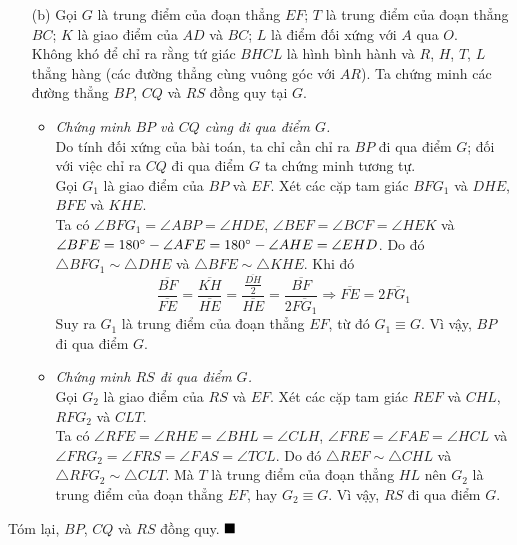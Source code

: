\documentclass{article} %
\newenvironment{solution}[1][Lời giải]{%
  \proof[\faPenNib \hspace{0.2cm} \ttfamily \scshape \large #1]%
}{\(\hfill \blacksquare\){\parfillskip0pt\par}}
\begin{document}
\begin{solution}
\begin{itemize}
                \item[(b)] Gọi \(G\) là trung điểm của đoạn thẳng \(EF\); \(T\) là trung điểm của đoạn thẳng \(BC\); \(K\) là giao điểm của \(AD\) và \(BC\); \(L\) là điểm đối xứng với \(A\) qua \(O\).\\
                Không khó để chỉ ra rằng tứ giác \(BHCL\) là hình bình hành và \(R\), \(H\), \(T\), \(L\) thẳng hàng (các đường thẳng cùng vuông góc với \(AR\)). Ta chứng minh các đường thẳng \(BP\), \(CQ\) và \(RS\) đồng quy tại \(G\).
                \begin{itemize}
                    \item \textit{Chứng minh \(BP\) và \(CQ\) cùng đi qua điểm \(G\).}\\
                    Do tính đối xứng của bài toán, ta chỉ cần chỉ ra \(BP\) đi qua điểm \(G\); đối với việc chỉ ra \(CQ\) đi qua điểm \(G\) ta chứng minh tương tự.\\
                    Gọi \(G_1\) là giao điểm của \(BP\) và \(EF\). Xét các cặp tam giác \(BFG_1\) và \(DHE\), \(BFE\) và \(KHE\).\\
                    Ta có \(\angle BFG_1 = \angle ABP = \angle HDE\), \(\angle BEF = \angle BCF = \angle HEK\) và \(\angle BFE = 180 \degree - \angle AFE = 180 \degree - \angle AHE = \angle EHD\). Do đó \(\triangle BFG_1 \sim \triangle DHE\) và \(\triangle BFE \sim \triangle KHE\). Khi đó
                    \[\frac{\overline{BF}}{\overline{FE}} = \frac{\overline{KH}}{\overline{HE}} = \frac{\frac{\overline{DH}}{2}}{\overline{HE}} = \frac{\overline{BF}}{2\overline{FG_1}} \Rightarrow \overline{FE} = 2\overline{FG_1}\]
                    Suy ra \(G_1\) là trung điểm của đoạn thẳng \(EF\), từ đó \(G_1 \equiv G\). Vì vậy, \(BP\) đi qua điểm \(G\).
                    \item \textit{Chứng minh \(RS\) đi qua điểm \(G\).}\\
                    Gọi \(G_2\) là giao điểm của \(RS\) và \(EF\). Xét các cặp tam giác \(REF\) và \(CHL\), \(RFG_2\) và \(CLT\).\\
                    Ta có \(\angle RFE = \angle RHE = \angle BHL = \angle CLH\), \(\angle FRE = \angle FAE = \angle HCL\) và \(\angle FRG_2 = \angle FRS = \angle FAS = \angle TCL\). Do đó \(\triangle REF \sim \triangle CHL\) và \(\triangle RFG_2 \sim \triangle CLT\). Mà \(T\) là trung điểm của đoạn thẳng \(HL\) nên \(G_2\) là trung điểm của đoạn thẳng \(EF\), hay \(G_2 \equiv G\). Vì vậy, \(RS\) đi qua điểm \(G\).
                \end{itemize}
            \end{itemize}
            \hspace{0.8cm} Tóm lại, \(BP\), \(CQ\) và \(RS\) đồng quy.
        \end{solution}
\end{document}
